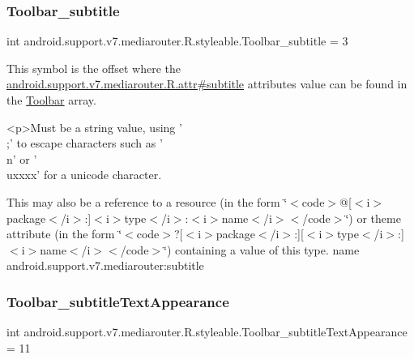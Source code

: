 \subsubsection{\texorpdfstring{Toolbar\+\_\+subtitle}{Toolbar\_subtitle}}
{\footnotesize\ttfamily int android.\+support.\+v7.\+mediarouter.\+R.\+styleable.\+Toolbar\+\_\+subtitle = 3\hspace{0.3cm}{\ttfamily [static]}}

This symbol is the offset where the \hyperlink{classandroid_1_1support_1_1v7_1_1mediarouter_1_1R_1_1attr_a66bf2c904966e1bb3cca8099c7dc3882}{android.\+support.\+v7.\+mediarouter.\+R.\+attr\#subtitle} attribute\textquotesingle{}s value can be found in the \hyperlink{classandroid_1_1support_1_1v7_1_1mediarouter_1_1R_1_1styleable_a6815cdfaadde30c82b955863af196899}{Toolbar} array.

\begin{DoxyVerb}      <p>Must be a string value, using '\\;' to escape characters such as '\\n' or '\\uxxxx' for a unicode character.
\end{DoxyVerb}
 

This may also be a reference to a resource (in the form \char`\"{}$<$code$>$@\mbox{[}$<$i$>$package$<$/i$>$\+:\mbox{]}$<$i$>$type$<$/i$>$\+:$<$i$>$name$<$/i$>$$<$/code$>$\char`\"{}) or theme attribute (in the form \char`\"{}$<$code$>$?\mbox{[}$<$i$>$package$<$/i$>$\+:\mbox{]}\mbox{[}$<$i$>$type$<$/i$>$\+:\mbox{]}$<$i$>$name$<$/i$>$$<$/code$>$\char`\"{}) containing a value of this type.  name android.\+support.\+v7.\+mediarouter\+:subtitle \mbox{\label{classandroid_1_1support_1_1v7_1_1mediarouter_1_1R_1_1styleable_ae7bd2ce11528308b118b298fe49859a8}} 
\subsubsection{\texorpdfstring{Toolbar\+\_\+subtitle\+Text\+Appearance}{Toolbar\_subtitleTextAppearance}}
{\footnotesize\ttfamily int android.\+support.\+v7.\+mediarouter.\+R.\+styleable.\+Toolbar\+\_\+subtitle\+Text\+Appearance = 11\hspace{0.3cm}{\ttfamily [static]}}

